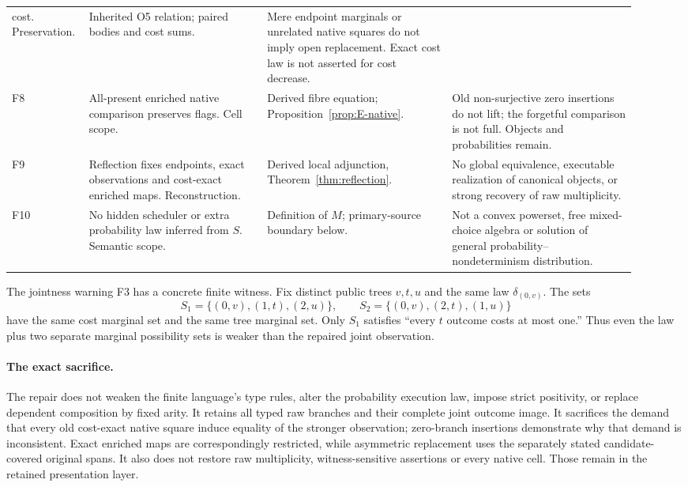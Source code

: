 \documentclass[11pt,a4paper]{article}
\theoremstyle{definition}
\begin{document}
\begin{longtable}{@{}p{0.08\linewidth}p{0.27\linewidth}p{0.29\linewidth}p{0.28\linewidth}@{}}
cost. Preservation. & Inherited O5 relation; paired bodies and cost sums.
& Mere endpoint marginals or unrelated native squares do not imply open
replacement. Exact cost law is not asserted for cost decrease.\\
F8 & All-present enriched native comparison preserves flags. Cell scope.
& Derived fibre equation; Proposition~\ref{prop:E-native}. & Old
non-surjective zero insertions do not lift; the forgetful comparison is
not full. Objects and probabilities remain.\\
F9 & Reflection fixes endpoints, exact observations and cost-exact enriched
maps. Reconstruction. & Derived local adjunction, Theorem~\ref{thm:reflection}.
& No global equivalence, executable realization of canonical objects,
or strong recovery of raw multiplicity.\\
F10 & No hidden scheduler or extra probability law inferred from $S$.
Semantic scope. & Definition of $M$; primary-source boundary below.
& Not a convex powerset, free mixed-choice algebra or solution of general
probability--nondeterminism distribution.\\
\bottomrule
\end{longtable}
\normalsize

The jointness warning F3 has a concrete finite witness. Fix distinct
public trees $v,t,u$ and the same law $\delta_{(0,v)}$. The sets
\[
 S_1=\{(0,v),(1,t),(2,u)\},\qquad
 S_2=\{(0,v),(2,t),(1,u)\}
\]
have the same cost marginal set and the same tree marginal set. Only
$S_1$ satisfies ``every $t$ outcome costs at most one.'' Thus even the
law plus two separate marginal possibility sets is weaker than the
repaired joint observation.

\paragraph{The exact sacrifice.}
The repair does not weaken the finite language's type rules, alter the
probability execution law, impose strict positivity, or replace dependent
composition by fixed arity. It retains all typed raw branches and their
complete joint outcome image. It sacrifices the demand that every old
cost-exact native square induce equality of the stronger observation;
zero-branch insertions demonstrate why that demand is inconsistent.
Exact enriched maps are correspondingly restricted, while asymmetric
replacement uses the separately stated candidate-covered original spans.
It also does not restore raw multiplicity, witness-sensitive assertions
or every native cell. Those remain in the retained presentation layer.
\end{document}
